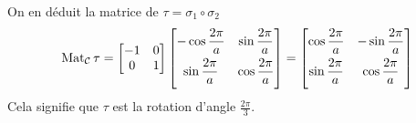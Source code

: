 \begin{enumerate}
\begin{enumerate}
On en déduit la matrice de $\tau=\sigma_1\circ \sigma_2$
\begin{displaymath}
 \Mat_{\mathcal C}\tau =
\begin{bmatrix}
 -1 & 0 \\
0 & 1
\end{bmatrix}
\begin{bmatrix}
 -\cos\dfrac{2\pi}{a} & \sin \dfrac{2\pi}{a} \vspace{4pt}\\
\sin \dfrac{2\pi}{a} & \cos \dfrac{2\pi}{a} \vspace{4pt}
\end{bmatrix}
=
\begin{bmatrix}
\cos\dfrac{2\pi}{a} & -\sin \dfrac{2\pi}{a} \vspace{4pt} \\
\sin \dfrac{2\pi}{a} & \cos \dfrac{2\pi}{a} \vspace{4pt}
\end{bmatrix}
\end{displaymath}
Cela signifie que $\tau$ est la rotation d'angle $\frac{2\pi}{3}$.
\end{enumerate}
 

\end{enumerate}
